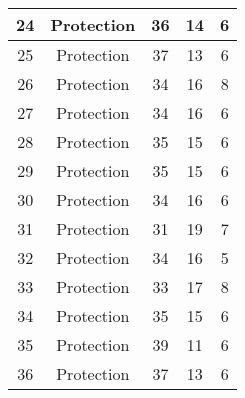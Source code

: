 \documentclass[results.tex]{subfiles}
\begin{document}
\begin{center}
\begin{tabular}{| c || c | c | c | c |}
            \hline
            24                      & Protection                   & 36                     & 14                      & 6                    \\
            \hline
            25                      & Protection                   & 37                     & 13                      & 6                    \\
            \hline
            26                      & Protection                   & 34                     & 16                      & 8                    \\
            \hline
            27                      & Protection                   & 34                     & 16                      & 6                    \\
            \hline
            28                      & Protection                   & 35                     & 15                      & 6                    \\
            \hline
            29                      & Protection                   & 35                     & 15                      & 6                    \\
            \hline
            30                      & Protection                   & 34                     & 16                      & 6                    \\
            \hline
            31                      & Protection                   & 31                     & 19                      & 7                    \\
            \hline
            32                      & Protection                   & 34                     & 16                      & 5                    \\
            \hline
            33                      & Protection                   & 33                     & 17                      & 8                    \\
            \hline
            34                      & Protection                   & 35                     & 15                      & 6                    \\
            \hline
            35                      & Protection                   & 39                     & 11                      & 6                    \\
            \hline
            36                      & Protection                   & 37                     & 13                      & 6                    \\

\end{tabular}
\end{center}
\end{document}
